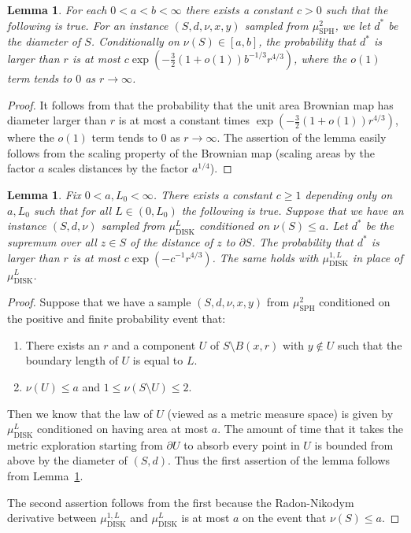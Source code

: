 \documentclass[JEP,XML,SOM,Unicode]{cedram}
\theoremstyle{plain}
\numberwithin{theorem}{section}
\newtheorem{lemma}[theorem]{Lemma}
\theoremstyle{definition}
\newcommand{\mustwo}{\mu_{\mathrm{SPH}}^2}
\newcommand{\mudonel}{\mu_{ \mathrm{DISK}}^{1, L}}
\newcommand{\mudl}{\mu_{\mathrm{DISK}}^L}
\begin{document}
\begin{lemma}
\label{lem::brownian_map_diameter_bound}
For each $0 < a < b < \infty$ there exists a constant $c > 0$ such that the following is true. For an instance $(S,d,\nu,x,y)$ sampled from $\mustwo$, we let $d^*$ be the diameter of $S$. Conditionally on $\nu(S) \in [a,b]$, the probability that $d^*$ is larger than $r$ is at most $c \exp(-\tfrac{3}{2}(1+o(1)) b^{-1/3} r^{4/3})$, where the $o(1)$ term tends to $0$ as $r \to \infty$.
\end{lemma}
\begin{proof}
It follows from \cite[Prop.\,14]{serlet_ldp} that the probability that the unit area Brownian map has diameter larger than $r$ is at most a constant times \hbox{$\exp(-\tfrac{3}{2}(1+o(1)) r^{4/3})$}, where the $o(1)$ term tends to $0$ as $r \to \infty$. The assertion of the lemma easily follows from the scaling property of the Brownian map (scaling areas by the factor $a$ scales distances by the factor $a^{1/4}$).
\end{proof}

\begin{lemma}
\label{lem::brownian_disk_area_bound}
Fix $0 < a, L_0 < \infty$. There exists a constant $c \geq 1$ depending only on $a, L_0$ such that for all $L \in (0,L_0)$ the following is true. Suppose that we have an instance $(S,d,\nu)$ sampled from $\mudl$ conditioned on $\nu(S) \leq a$. Let $d^*$ be the supremum over all $z \in S$ of the distance of $z$ to $\partial S$. The probability that $d^*$ is larger than $r$ is at most $c \exp(-c^{-1} r^{4/3})$. The same holds with $\mudonel$ in place of $\mudl$.
\end{lemma}
\begin{proof}
Suppose that we have a sample $(S,d,\nu,x,y)$ from $\mustwo$ conditioned on the positive and finite probability event that:
\begin{enumerate}
\item There exists an $r$ and a component $U$ of $S \setminus B(x,r)$ with $y \notin U$ such that the boundary length of $U$ is equal to $L$.
\item $\nu(U) \leq a$ and $1 \leq \nu(S \setminus U) \leq 2$.
\end{enumerate}
Then we know that the law of $U$ (viewed as a metric measure space) is given by $\mudl$ conditioned on having area at most $a$. The amount of time that it takes the metric exploration starting from $\partial U$ to absorb every point in $U$ is bounded from above by the diameter of $(S,d)$. Thus the first assertion of the lemma follows from Lemma~\ref{lem::brownian_map_diameter_bound}.

The second assertion follows from the first because the Radon-Nikodym derivative between $\mudonel$ and $\mudl$ is at most $a$ on the event that $\nu(S) \leq a$.
\end{proof}
\end{document}
